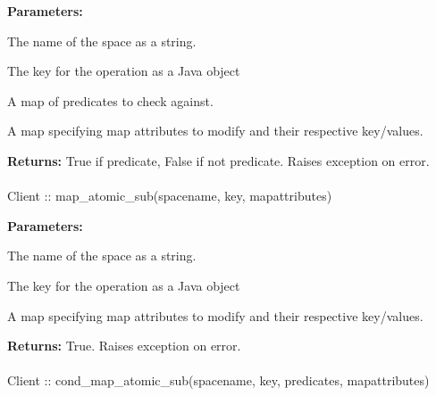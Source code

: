 \noindent\textbf{Parameters:}
\begin{description}[labelindent=\widthof{{\code{mapattributes}}},leftmargin=*,noitemsep,nolistsep,align=right]
\item[\code{spacename}] The name of the space as a string.
\item[\code{key}] The key for the operation as a Java object
\item[\code{predicates}] A map of predicates to check against.
\item[\code{mapattributes}] A map specifying map attributes to modify and their respective key/values.
\end{description}

\noindent\textbf{Returns:}
True if predicate, False if not predicate.  Raises exception on error.

\paragraph{}
\label{api:java:map_atomic_sub}
\begin{javacode}
Client :: map_atomic_sub(spacename, key, mapattributes)
\end{javacode}
\funcdesc 

\noindent\textbf{Parameters:}
\begin{description}[labelindent=\widthof{{\code{mapattributes}}},leftmargin=*,noitemsep,nolistsep,align=right]
\item[\code{spacename}] The name of the space as a string.
\item[\code{key}] The key for the operation as a Java object
\item[\code{mapattributes}] A map specifying map attributes to modify and their respective key/values.
\end{description}

\noindent\textbf{Returns:}
True.  Raises exception on error.

\paragraph{}
\label{api:java:cond_map_atomic_sub}
\begin{javacode}
Client :: cond_map_atomic_sub(spacename, key, predicates, mapattributes)
\end{javacode}
\funcdesc 

